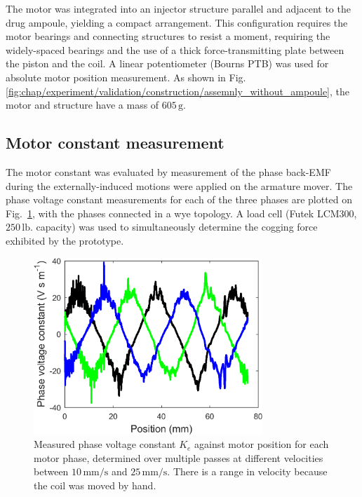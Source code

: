     
            The motor was integrated into an injector structure parallel and adjacent to the drug ampoule, yielding a compact arrangement. This configuration requires the motor bearings and connecting structures to resist a moment, requiring the widely-spaced bearings and the use of a thick force-transmitting plate between the piston and the coil. A linear potentiometer (Bourns PTB) was used for absolute motor position measurement. As shown in Fig.\,\ref{fig:chap/experiment/validation/construction/assemnly_without_ampoule}, the motor and structure have a mass of $605\,\mathrm{g}$.
    

        \subsection{Motor constant measurement}     \label{Chapter:experiment/validation/motor constant}
        
            
            The motor constant was evaluated by measurement of the phase back-EMF during the externally-induced motions were applied on the armature mover. The phase voltage constant measurements for each of the three phases are plotted on Fig.~\ref{fig:chap/experiment/motor_constant/kms_plot}, with the phases connected in a wye topology. A load cell (Futek LCM300, $250\,\mathrm{lb.}$ capacity) was used to simultaneously determine the cogging force exhibited by the prototype. 

        
            \begin{figure}[h]
                \centering
                \includegraphics[width=3.4in]{chap5/images/kms_plot.png}
                \caption{Measured phase voltage constant $K_e$ against motor position for each motor phase, determined over multiple passes at different velocities between $10\,\mathrm{mm/s}$ and $25\,\mathrm{mm/s}$. There is a range in velocity because the coil was moved by hand.}
                \label{fig:chap/experiment/motor_constant/kms_plot}
            \end{figure}


